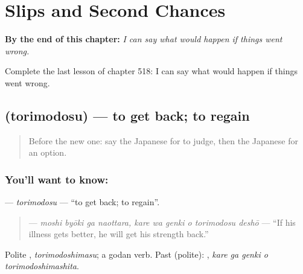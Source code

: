 
\chapter{Slips and Second Chances}
\label{ch:ja-slips-and-second-chances}

\begin{chapteropening}
\textbf{By the end of this chapter:} \emph{I can say what would happen if things went wrong.}

Complete the last lesson of chapter 518: I can say what would happen if things went wrong.
\end{chapteropening}

\section[\texorpdfstring{\ja{とりもどす} (torimodosu)}{とりもどす (torimodosu)}]{ (torimodosu) — to get back; to regain}

\label{lesson:JA-C518-torimodosu}



\begin{quote}
Before the new one: say the Japanese for to judge, then the Japanese for an option.
\end{quote}

\subsection*{You'll want to know: }
\textbf{} — \emph{torimodosu} — \textquotedblleft{}to get back; to regain\textquotedblright{}.

\begin{quote}
\textbf{    } — \emph{moshi byōki ga naottara, kare wa genki o torimodosu deshō} — \textquotedblleft{}If his illness gets better, he will get his strength back.\textquotedblright{}
\end{quote}

Polite \textbf{}, \emph{torimodoshimasu}; a godan verb. Past (polite): \textbf{  }, \emph{kare ga genki o torimodoshimashita}.

